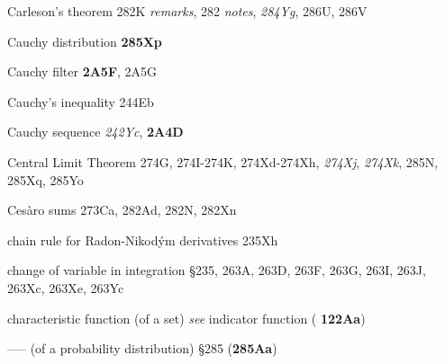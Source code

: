 Carleson's theorem 282K {\it remarks}, 282 {\it notes}, {\it 284Yg},
286U, 286V













Cauchy distribution {\bf 285Xp}


Cauchy filter {\bf 2A5F}, 2A5G


Cauchy's inequality 244Eb




Cauchy sequence {\it 242Yc}, {\bf 2A4D}































Central Limit Theorem 274G, 274I-274K, 
274Xd-274Xh, 
{\it 274Xj}, {\it 274Xk}, 285N, 285Xq, 285Yo


Ces\`aro sums 273Ca, 282Ad, 282N, 282Xn











chain rule for Radon-Nikod\'ym derivatives 235Xh







change of variable in integration \S235,
263A, 263D, 263F, 263G, 263I, 263J, 263Xc, 263Xe, 263Yc





characteristic function (of a set) {\it see} indicator function ({\bf
122Aa})

----- (of a probability distribution) \S285 ({\bf 285Aa})



